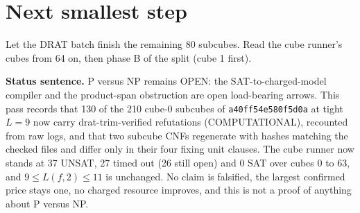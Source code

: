 \documentclass[11pt]{article}
\begin{document}
\section*{Next smallest step}
Let the DRAT batch finish the remaining 80 subcubes. Read the cube runner's cubes from 64 on, then phase B of the split (cube 1 first).

\bigskip
\noindent\textbf{Status sentence.} P versus NP remains OPEN: the SAT-to-charged-model compiler and the product-span obstruction are open load-bearing arrows. This pass records that 130 of the 210 cube-0 subcubes of \texttt{a40ff54e580f5d0a} at tight $L=9$ now carry drat-trim-verified refutations (COMPUTATIONAL), recounted from raw logs, and that two subcube CNFs regenerate with hashes matching the checked files and differ only in their four fixing unit clauses. The cube runner now stands at 37 UNSAT, 27 timed out (26 still open) and 0 SAT over cubes 0 to 63, and $9\le L(f,2)\le 11$ is unchanged. No claim is falsified, the largest confirmed price stays one, no charged resource improves, and this is not a proof of anything about P versus NP.
\end{document}
